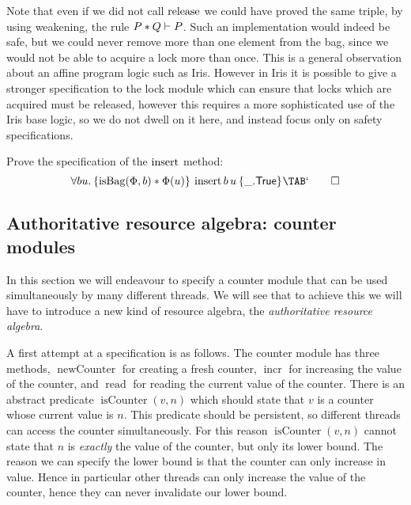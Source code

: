 \begin{example}
  \begin{remark}
    Note that even if we did not call $\operatorname{release}$ we could have proved the same triple, by using weakening, \ie{} the rule $P \ast Q \vdash P$.
    Such an implementation would indeed be safe, but we could never remove more than one element from the bag, since we would not be able to acquire a lock more than once.
    This is a general observation about an affine program logic such as Iris.
    However in Iris it is possible to give a stronger specification to the lock module which can ensure that locks which are acquired must be released, however this requires a more sophisticated use of the Iris base logic, so we do not dwell on it here, and instead focus only on safety specifications.
  \end{remark}
  \begin{exercise}
    Prove the specification of the $\operatorname{insert}$ method:
    \begin{displaymath}
      \All b u.\hoare{\isBag(\Phi,b) \ast \Phi(u)}{\binsert b\,u}{\_.\TRUE} \qedhere
    \end{displaymath}
  \end{exercise}
  
\end{example}

\subsection{Authoritative resource algebra: counter modules}
\label{sec:authoritative-ra}

\newcommand{\isCounter}{\operatorname{isCounter}}
\newcommand{\incrC}{\operatorname{incr}}
\newcommand{\readC}{\operatorname{read}}
\newcommand{\newC}{\operatorname{newCounter}}

In this section we will endeavour to specify a counter module that can be used simultaneously by many different threads.
We will see that to achieve this we will have to introduce a new kind of resource algebra, the \emph{authoritative resource algebra}.

A first attempt at a specification is as follows.
The counter module has three methods, $\newC$ for creating a fresh counter, $\incrC$ for increasing the value of the counter, and $\readC$ for reading the current value of the counter.
There is an abstract predicate $\isCounter(v,n)$ which should state that $v$ is a counter whose current value is $n$.
This predicate should be persistent, so different threads can access the counter simultaneously.
For this reason $\isCounter(v, n)$ cannot state that $n$ is \emph{exactly} the value of the counter, but only its lower bound.
The reason we can specify the lower bound is that the counter can only increase in value.
Hence in particular other threads can only increase the value of the counter, hence they can never invalidate our lower bound.

